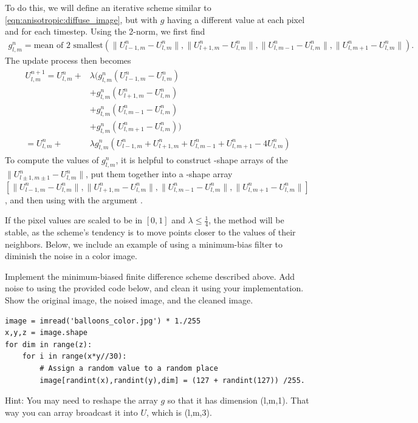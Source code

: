 To do this, we will define an iterative scheme similar to \eqref{eqn:anisotropic:diffuse_image}, but with $g$ having a different value at each pixel and for each timestep.
Using the 2-norm, we first find
\begin{align}
g^n_{l,m} = \text{mean of 2 smallest}\left ( \|U^n_{l-1,m}-U^n_{l,m}\|, \|U^n_{l+1,m}-U^n_{l,m}\|, \|U^n_{l,m-1}-U^n_{l,m}\|, \|U^n_{l,m+1}-U^n_{l,m}\| \right).
\label{eqn:anisotropic:gp}
\end{align}
The update process then becomes
\begin{align}
\begin{split}
U_{l,m}^{n+1} = U_{l,m}^n + & \lambda (g^n_{l,m}(U_{l-1,m}^n - U_{l,m}^n) \\
					& + g^n_{l,m}(U_{l+1,m}^n - U_{l,m}^n) \\
					& + g^n_{l,m}(U_{l,m-1}^n - U_{l,m}^n) \\
					& + g^n_{l,m}(U_{l,m+1}^n - U_{l,m}^n))\\
=U_{l,m}^n + &\lambda g^n_{l,m}(U_{l-1,m}^n + U_{l+1,m}^n  + U_{l,m-1}^n + U_{l,m+1}^n - 4U_{l,m}^n)
\label{eqn:anisotropic:min_bias}
\end{split}
\end{align}
To compute the values of $g^n_{l,m}$, it is helpful to construct -shape arrays of the $\|U^n_{l\pm1,m\pm1}-U^n_{l,m}\|$, put them together into a -shape array $[\|U^n_{l-1,m}-U^n_{l,m}\|, \|U^n_{l+1,m}-U^n_{l,m}\|, \|U^n_{l,m-1}-U^n_{l,m}\|, \|U^n_{l,m+1}-U^n_{l,m}\|]$, and then using  with the argument .

If the pixel values are scaled to be in $[0,1]$ and $\lambda\leq \frac14$, the method will be stable, as the scheme's tendency is to move points closer to the values of their neighbors.
Below, we include an example of using a minimum-bias filter to diminish the noise in a color image.

\begin{problem}

Implement the minimum-biased finite difference scheme described above.
Add noise to  using the provided code below, and clean it using your implementation.
Show the original image, the noised image, and the cleaned image. 

\begin{lstlisting}
image = imread('balloons_color.jpg') * 1./255
x,y,z = image.shape
for dim in range(z):
    for i in range(x*y//30):
        # Assign a random value to a random place
        image[randint(x),randint(y),dim] = (127 + randint(127)) /255.
\end{lstlisting}
Hint: You may need to reshape the array $g$ so that it has dimension (l,m,1). That way you can array broadcast it into $U$, which is (l,m,3).

\end{problem}

